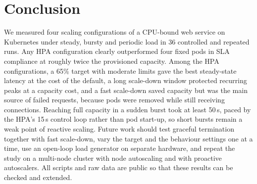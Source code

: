 \documentclass[conference,a4paper]{IEEEtran}
\begin{document}
\section{Conclusion}
\label{sec:conclusion}

We measured four scaling configurations of a CPU-bound web service on
Kubernetes under steady, bursty and periodic load in 36 controlled and
repeated runs. Any HPA configuration clearly outperformed four fixed pods in
SLA compliance at roughly twice the provisioned capacity. Among the HPA
configurations, a 65\% target with moderate limits gave the best steady-state
latency at the cost of the default, a long scale-down window protected
recurring peaks at a capacity cost, and a fast scale-down saved capacity but
was the main source of failed requests, because pods were removed while still
receiving connections. Reaching full capacity in a sudden burst took at least 50\,s,
paced by the HPA's 15\,s control loop rather than pod start-up, so short bursts remain a
weak point of reactive scaling. Future work should test graceful termination
together with fast scale-down, vary the target and the behaviour settings one
at a time, use an open-loop load generator on separate hardware, and repeat
the study on a multi-node cluster with node autoscaling and with proactive
autoscalers. All scripts and raw data are public so that these results can be
checked and extended.

\renewcommand{\bibfont}{\footnotesize}


\end{document}
